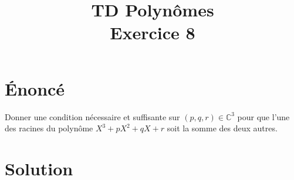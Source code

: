 \documentclass[french]{article}
\title{TD Polynômes \\ Exercice 8}
\date{}
\newcommand{\C}{\mathbb{C}}
\begin{document}
\maketitle

\section{Énoncé}
Donner une condition nécessaire et suffisante sur $(p,q,r)\in\C^3$ pour que l'une des racines du polynôme $X^3+pX^2+qX+r$ soit la somme des deux autres.
\section{Solution}
\end{document}
